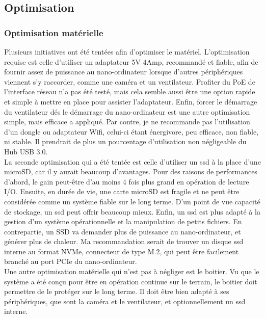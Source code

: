 \subsection{Optimisation}
\subsubsection{Optimisation matérielle}
\noindent Plusieurs initiatives ont été tentées afin d'optimiser le matériel. L'optimisation requise est celle d'utiliser un adaptateur 5V 4Amp, recommandé et fiable, afin de fournir assez de puissance au nano-ordinateur lorsque d'autres périphériques viennent s'y raccorder, comme une caméra et un ventilateur. Profiter du PoE de l'interface réseau n'a pas été testé, mais cela semble aussi être une option rapide et simple à mettre en place pour assister l'adaptateur. Enfin, forcer le démarrage du ventilateur dés le démarrage du nano-ordinateur est une autre optimisation simple, mais efficace a appliqué. Par contre, je ne recommande pas l'utilisation d'un dongle ou adaptateur Wifi, celui-ci étant énergivore, peu efficace, non fiable, ni stable. Il prendrait de plus un pourcentage d'utilisation non négligeable du Hub USB 3.0. 
\vspace{0.5\baselineskip}
\\
\noindent La seconde optimisation qui a été tentée est celle d'utiliser un \acrshort{ssd} à la place d'une microSD, car il y aurait beaucoup d'avantages. Pour des raisons de performances d'abord, le gain peut-être d'au moins 4 fois plus grand en opération de lecture I/O. Ensuite, en durée de vie, une carte microSD est fragile et ne peut être considérée comme un système fiable sur le long terme. D'un point de vue capacité de stockage, un \acrshort{ssd} peut offrir beaucoup mieux. Enfin, un \acrshort{ssd} est plus adapté à la gestion d'un système opérationnelle et la manipulation de petits fichiers. En contrepartie, un SSD va demander plus de puissance au nano-ordinateur, et générer plus de chaleur. Ma recommandation serait de trouver un disque \acrshort{ssd} interne au format NVMe, connecteur de type M.2, qui peut être facilement branché au port PCIe du nano-ordinateur.
\vspace{0.5\baselineskip}
\\
\noindent Une autre optimisation matérielle qui n'est pas à négliger est le boitier. Vu que le système a été conçu pour être en opération continue sur le terrain, le boitier doit permettre de le protéger sur le long terme. Il doit être bien adapté à ses périphériques, que sont la caméra et le ventilateur, et optionnellement un \acrshort{ssd} interne.
